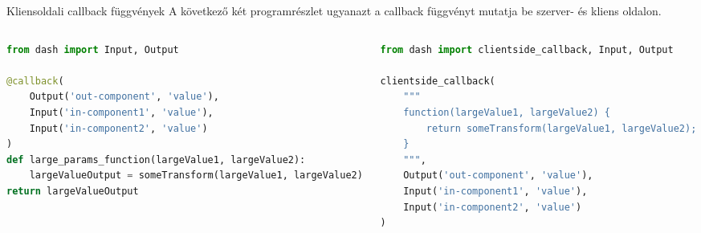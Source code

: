 \documentclass[english, aspectratio=169]{beamer}
\begin{document}
\begin{frame}[fragile]{Kliensoldali callback függvények}
	A következő két programrészlet ugyanazt a callback függvényt mutatja be szerver- és kliens oldalon. 
	\begin{columns}
		\begin{column}{.5\textwidth}
			\begin{lstlisting}[language=python]
from dash import Input, Output

@callback(
	Output('out-component', 'value'),
	Input('in-component1', 'value'),
	Input('in-component2', 'value')
)
def large_params_function(largeValue1, largeValue2):
	largeValueOutput = someTransform(largeValue1, largeValue2)
return largeValueOutput	
			\end{lstlisting}
		\end{column}
		\begin{column}{.5\textwidth}
			\begin{lstlisting}[language=python]
from dash import clientside_callback, Input, Output

clientside_callback(
	"""
	function(largeValue1, largeValue2) {
		return someTransform(largeValue1, largeValue2);
	}
	""",
	Output('out-component', 'value'),
	Input('in-component1', 'value'),
	Input('in-component2', 'value')
)
			\end{lstlisting}
		\end{column}
	\end{columns}
\end{frame}
\end{document}
